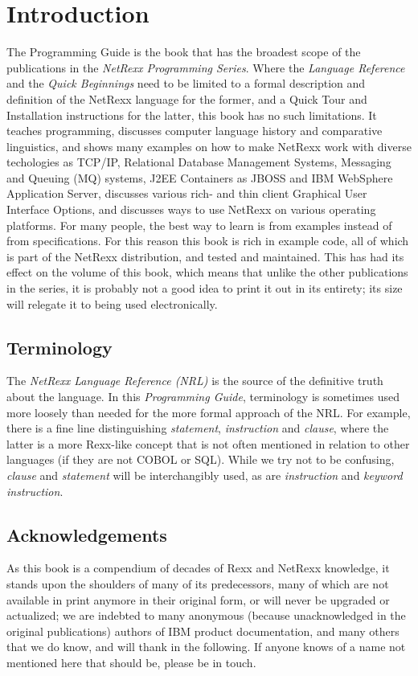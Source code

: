\chapter{Introduction}
The Programming Guide is the book that has the broadest scope of the publications in the \emph{NetRexx Programming Series}. Where the \emph{Language Reference} and the \emph{Quick Beginnings} need to be limited to a formal description and definition of the NetRexx language for the former, and a Quick Tour and Installation instructions for the latter, this book has no such limitations. It teaches programming, discusses computer language history and comparative linguistics, and shows many examples on how to make NetRexx work with diverse techologies as TCP/IP, Relational Database Management Systems, Messaging and Queuing (MQ\textsuperscript{\texttrademark}) systems, J2EE Containers as JBOSS\textsuperscript{\texttrademark} and IBM WebSphere Application Server\textsuperscript{\texttrademark}, discusses various rich- and thin client Graphical User Interface Options, and discusses ways to use NetRexx on various operating platforms. For many people, the best way to learn is from examples instead of from specifications. For this reason this book is rich in example code, all of which is part of the NetRexx distribution, and tested and maintained. This has had its effect on the volume of this book, which means that unlike the other publications in the series, it is probably not a good idea to print it out in its entirety; its size will relegate it to being used electronically.
\section*{Terminology}
The \emph{NetRexx Language Reference (NRL)} is the source of the definitive truth about the language. In this \emph{Programming Guide}, terminology is sometimes used more loosely than needed for the more formal approach of the NRL. For example, there is a fine line distinguishing \emph{statement}, \emph{instruction} and \emph{clause}, where the latter is a more Rexx-like concept that is not often mentioned in relation to other languages (if they are not COBOL or SQL). While we try not to be confusing, \emph{clause} and \emph{statement} will be interchangibly used, as are \emph{instruction} and \emph{keyword instruction}.
\section*{Acknowledgements}
As this book is a compendium of decades of Rexx and NetRexx knowledge, it stands upon the shoulders of many of its predecessors, many of which are not available in print anymore in their original form, or will never be upgraded or actualized; we are indebted to many anonymous (because unacknowledged in the original publications) authors of IBM product documentation, and many others that we do know, and will thank in the following. If anyone knows of a name not mentioned here that should be, please be in touch. 

